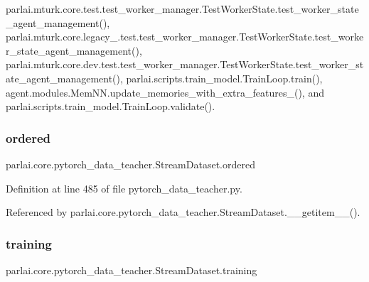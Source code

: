parlai.\+mturk.\+core.\+test.\+test\+\_\+worker\+\_\+manager.\+Test\+Worker\+State.\+test\+\_\+worker\+\_\+state\+\_\+agent\+\_\+management(), parlai.\+mturk.\+core.\+legacy\+\_.\+test.\+test\+\_\+worker\+\_\+manager.\+Test\+Worker\+State.\+test\+\_\+worker\+\_\+state\+\_\+agent\+\_\+management(), parlai.\+mturk.\+core.\+dev.\+test.\+test\+\_\+worker\+\_\+manager.\+Test\+Worker\+State.\+test\+\_\+worker\+\_\+state\+\_\+agent\+\_\+management(), parlai.\+scripts.\+train\+\_\+model.\+Train\+Loop.\+train(), agent.\+modules.\+Mem\+N\+N.\+update\+\_\+memories\+\_\+with\+\_\+extra\+\_\+features\+\_\+(), and parlai.\+scripts.\+train\+\_\+model.\+Train\+Loop.\+validate().

\mbox{\label{classparlai_1_1core_1_1pytorch__data__teacher_1_1StreamDataset_affabf282bb6e556bfc5b3d8402924b8b}} 
\subsubsection{\texorpdfstring{ordered}{ordered}}
{\footnotesize\ttfamily parlai.\+core.\+pytorch\+\_\+data\+\_\+teacher.\+Stream\+Dataset.\+ordered}



Definition at line 485 of file pytorch\+\_\+data\+\_\+teacher.\+py.



Referenced by parlai.\+core.\+pytorch\+\_\+data\+\_\+teacher.\+Stream\+Dataset.\+\_\+\+\_\+getitem\+\_\+\+\_\+().

\mbox{\label{classparlai_1_1core_1_1pytorch__data__teacher_1_1StreamDataset_a57104c9e186b0a6d78e6d0ac4c0ab1db}} 
\subsubsection{\texorpdfstring{training}{training}}
{\footnotesize\ttfamily parlai.\+core.\+pytorch\+\_\+data\+\_\+teacher.\+Stream\+Dataset.\+training}



